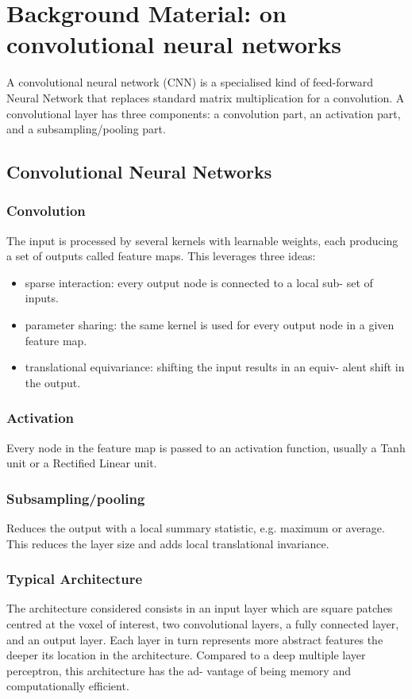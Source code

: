 \chapter{Background Material: on convolutional neural networks}

A convolutional neural network (CNN) is a specialised kind of feed-forward Neural Network that replaces standard matrix multiplication for a convolution. A convolutional layer has three components: a convolution part, an activation part, and a subsampling/pooling part.

\section{Convolutional Neural Networks}

\subsection{Convolution}

The input is processed by several kernels with learnable weights, each producing a set of outputs called feature maps. This leverages three ideas:

\begin{itemize}
	\item sparse interaction: every output node is connected to a local sub- set of inputs.
	\item parameter sharing: the same kernel is used for every output node in a given feature map.
	\item translational equivariance: shifting the input results in an equiv- alent shift in the output.
\end{itemize}

\subsection{Activation}
Every node in the feature map is passed to an activation function, usually a Tanh unit or a Rectified Linear unit.

\subsection{Subsampling/pooling}

Reduces the output with a local summary statistic, e.g. maximum or average. This reduces the layer size and adds local translational invariance.

\subsection{Typical Architecture}

The architecture considered consists in an input layer which are square patches centred at the voxel of interest, two convolutional layers, a fully connected layer, and an output layer. Each layer in turn represents more abstract features the deeper its location in the architecture.
Compared to a deep multiple layer perceptron, this architecture has the ad- vantage of being memory and computationally efficient.